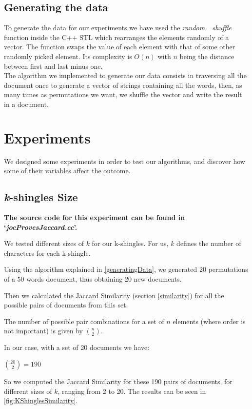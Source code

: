 \documentclass[12pt]{article}
\begin{document}
\subsection{Generating the data} \label{generatingData}

To generate the data for our experiments we have used the \textit{random\_ shuffle} function inside the C++ STL which rearranges the elements randomly of a vector. The function swaps the value of each element with that of some other randomly picked element. Its complexity is $O(n)$ with $n$ being  the distance between first and last minus one.\\

The algorithm we implemented to generate our data consists in traversing all the document once to generate a vector of strings containing all the words, then, as many times as permutations we want, we shuffle the vector and write the result in a document. \\

\section{Experiments}
We designed some experiments in order to test our algorithms, and discover how some of their variables affect the outcome.

\subsection{\textit{k}-shingles Size}
\textbf{The source code for this experiment can be found in `\textit{jocProvesJaccard.cc}'.}
\bigskip

We tested different sizes of $k$ for our k-shingles.
For us, $k$ defines the number of characters for each k-shingle.

Using the algorithm explained in \autoref{generatingData}, we generated 20 permutations of a 50 words document, thus obtaining 20 new documents.

Then we calculated the Jaccard Similarity (section \ref{similarity}) for all the possible pairs of documents from this set.

The number of possible pair combinations for a set of $n$ elements (where order is not important) is given by $\binom{n}{2}$.

In our case, with a set of 20 documents we have:
\bigbreak
\centerline{\large $\binom{20}{2} = 190$}
\bigbreak

So we computed the Jaccard Similarity for these 190 pairs of documents, for different sizes of $k$, ranging from 2 to 20. The results can be seen in \autoref{fig:KShinglesSimilarity}.
\end{document}
